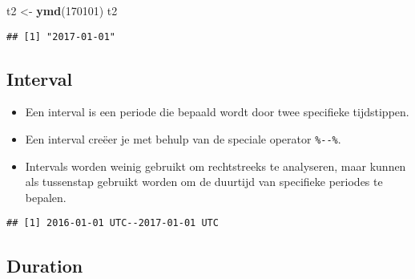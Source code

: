 \documentclass[]{memoir}
\newenvironment{Shaded}{\begin{snugshade}}{\end{snugshade}}
\newcommand{\DecValTok}[1]{\textcolor[rgb]{0.00,0.00,0.81}{#1}}
\newcommand{\KeywordTok}[1]{\textcolor[rgb]{0.13,0.29,0.53}{\textbf{#1}}}
\newcommand{\NormalTok}[1]{#1}
\newcommand{\OperatorTok}[1]{\textcolor[rgb]{0.81,0.36,0.00}{\textbf{#1}}}
\newcommand{\StringTok}[1]{\textcolor[rgb]{0.31,0.60,0.02}{#1}}
\providecommand{\tightlist}{%
  \setlength{\itemsep}{0pt}\setlength{\parskip}{0pt}}
\begin{document}
\begin{Shaded}
\begin{Highlighting}[]
\NormalTok{t2 <-}\StringTok{ }\KeywordTok{ymd}\NormalTok{(}\DecValTok{170101}\NormalTok{)}
\NormalTok{t2}
\end{Highlighting}
\end{Shaded}

\begin{verbatim}
## [1] "2017-01-01"
\end{verbatim}

\hypertarget{interval-1}{%
\subsection{Interval}\label{interval-1}}

\begin{itemize}
\tightlist
\item
  Een interval is een periode die bepaald wordt door twee specifieke tijdstippen.
\item
  Een interval creëer je met behulp van de speciale operator \texttt{\%-\/-\%}.
\item
  Intervals worden weinig gebruikt om rechtstreeks te analyseren, maar kunnen als tussenstap gebruikt worden om de duurtijd van specifieke periodes te bepalen.
\end{itemize}

\begin{Shaded}
\end{Shaded}

\begin{verbatim}
## [1] 2016-01-01 UTC--2017-01-01 UTC
\end{verbatim}

\hypertarget{duration}{%
\subsection{Duration}\label{duration}}
\end{document}
